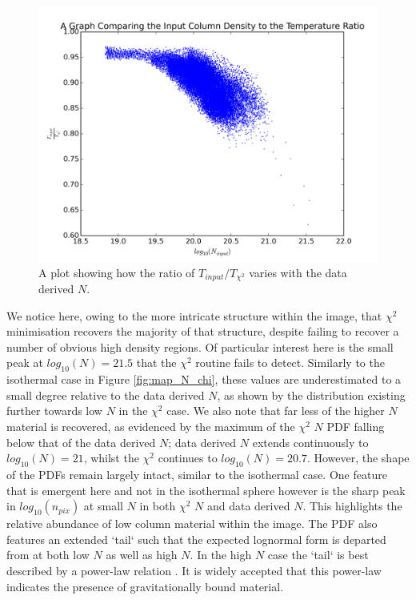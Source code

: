 \documentclass{report}
\begin{document}
\begin{figure}[H]
  \centering
  \includegraphics[width=0.45\linewidth]{../img/sph/T_ratio_inp.png}
  \caption{A plot showing how the ratio of $T_{input}/T_{\chi^{2}}$ varies with the data derived $N$.}\label{fig:T_ratio_sph}
\end{figure}

We notice here, owing to the more intricate structure within the image, that $\chi^{2}$ minimisation recovers the majority of that structure, despite failing to recover a number of obvious high density regions. Of particular interest here is the small peak at $log_{10}(N)=21.5$ that the $\chi^{2}$ routine fails to detect. Similarly to the isothermal case in Figure \ref{fig:map_N_chi}, these values are underestimated to a small degree relative to the data derived $N$, as shown by the distribution existing further towards low $N$ in the $\chi^{2}$ case. We also note that far less of the higher $N$ material is recovered, as evidenced by the maximum of the $\chi^{2}$ $N$ PDF falling below that of the data derived $N$; data derived $N$ extends continuously to $log_{10}(N)=21$, whilst the $\chi^{2}$ continues to $log_{10}(N)=20.7$. However, the shape of the PDFs remain largely intact, similar to the isothermal case. One feature that is emergent here and not in the isothermal sphere however is the sharp peak in $log_{10}(n_{pix})$ at small $N$ in both $\chi^{2}$
$N$ and data derived $N$. This highlights the relative abundance of low column material within the image. The PDF also features an extended `tail` such that the expected lognormal form is departed from at both low $N$ as well as high $N$. In the high $N$ case the `tail` is best described by a power-law relation \parencite{tail,powerlaw}. It is widely accepted that this power-law indicates the presence of gravitationally bound material.
\end{document}
